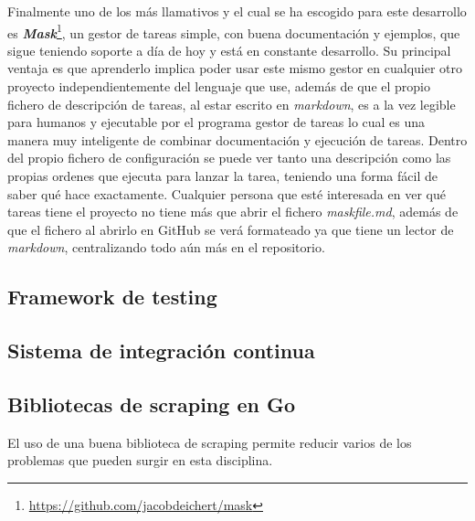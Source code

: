 Finalmente uno de los más llamativos y el cual se ha escogido para este
desarrollo es
\textbf{\textit{Mask}}\footnote{\url{https://github.com/jacobdeichert/mask}}, un
gestor de tareas simple, con buena documentación y ejemplos, que sigue teniendo
soporte a día de hoy y está en constante desarrollo. Su principal ventaja es que
aprenderlo implica poder usar este mismo gestor en cualquier otro proyecto
independientemente del lenguaje que use, además de que el propio fichero de
descripción de tareas, al estar escrito en \textit{markdown}, es a la vez
legible para humanos y ejecutable por el programa gestor de tareas lo cual es
una manera muy inteligente de combinar documentación y ejecución de tareas.
Dentro del propio fichero de configuración se puede ver tanto una descripción
como las propias ordenes que ejecuta para lanzar la tarea, teniendo una forma
fácil de saber qué hace exactamente. Cualquier persona que esté interesada en
ver qué tareas tiene el proyecto no tiene más que abrir el fichero
\textit{maskfile.md}, además de que el fichero al abrirlo en GitHub se verá
formateado ya que tiene un lector de \textit{markdown}, centralizando todo aún
más en el repositorio.

\subsection{Framework de testing}
\subsection{Sistema de integración continua}
\subsection{Bibliotecas de scraping en Go}
El uso de una buena biblioteca de scraping permite reducir varios de los
problemas que pueden surgir en esta disciplina.